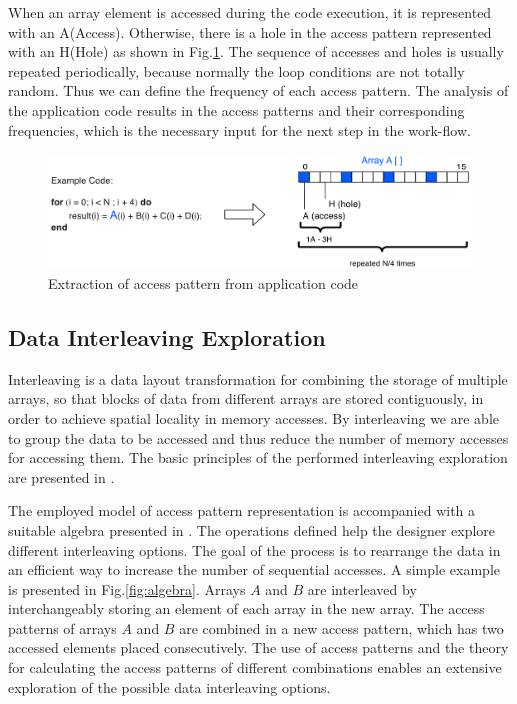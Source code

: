 When an array element is accessed during the code execution, it is represented with an A(Access).
Otherwise, there is a hole in the access pattern represented with an H(Hole) as shown in Fig.\ref{fig:pattern}.
The sequence of accesses and holes is usually repeated periodically, because normally the loop conditions are not totally random.
Thus we can define the frequency of each access pattern.
The analysis of the application code results in the access patterns and their corresponding frequencies, which is the necessary input for the next step in the work-flow.

\begin{figure}
\centering
	\includegraphics[width=\textwidth]{D/Images/AHpattern.pdf} 
	\caption{Extraction of access pattern from application code}
	\label{fig:pattern}
\end{figure}


\subsection{Data Interleaving Exploration}
Interleaving is a data layout transformation for combining the storage of multiple arrays, so that blocks of data from different arrays are stored contiguously, in order to achieve spatial locality in memory accesses.
By interleaving we are able to group the data to be accessed and thus reduce the number of memory accesses for accessing them.
The basic principles of the performed interleaving exploration are presented in \cite{sharma2013data}.

The employed model of access pattern representation is accompanied with a suitable algebra presented in \cite{kritikakou2013phd}.
The operations defined help the designer explore different interleaving options.
The goal of the process is to rearrange the data in an efficient way to increase the number of sequential accesses.
A simple example is presented in Fig.\ref{fig:algebra}.
Arrays $A$ and $B$ are interleaved by interchangeably storing an element of each array in the new array. 
The access patterns of arrays $A$ and $B$ are combined in a new access pattern, which has two accessed elements placed consecutively.
The use of access patterns and the theory for calculating the access patterns of different combinations enables an extensive exploration of the possible data interleaving options.

